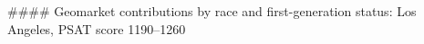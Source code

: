 #### Geomarket contributions by race and first-generation status: Los Angeles, PSAT score 1190–1260
